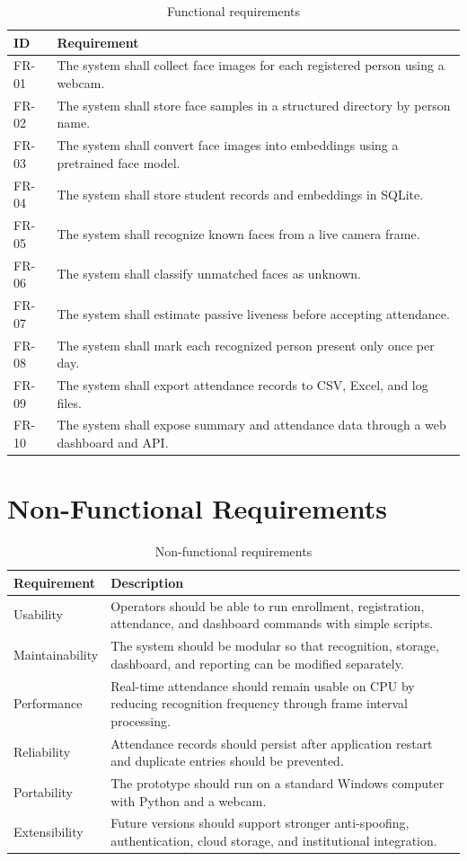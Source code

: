 \documentclass[12pt,a4paper]{report}
\newcommand{\JustifiedNormal}{\fontsize{12}{14}\selectfont\justifying\setlength{\parindent}{0pt}}
\begin{document}
\begin{longtable}{|p{}|p{}|}
\caption{Functional requirements}\\
\hline
\textbf{ID} & \textbf{Requirement}\\
\hline
FR-01 & The system shall collect face images for each registered person using a webcam.\\
\hline
FR-02 & The system shall store face samples in a structured directory by person name.\\
\hline
FR-03 & The system shall convert face images into embeddings using a pretrained face model.\\
\hline
FR-04 & The system shall store student records and embeddings in SQLite.\\
\hline
FR-05 & The system shall recognize known faces from a live camera frame.\\
\hline
FR-06 & The system shall classify unmatched faces as unknown.\\
\hline
FR-07 & The system shall estimate passive liveness before accepting attendance.\\
\hline
FR-08 & The system shall mark each recognized person present only once per day.\\
\hline
FR-09 & The system shall export attendance records to CSV, Excel, and log files.\\
\hline
FR-10 & The system shall expose summary and attendance data through a web dashboard and API.\\
\hline
\end{longtable}

\section{Non-Functional Requirements}
\JustifiedNormal
\begin{longtable}{|p{}|p{}|}
\caption{Non-functional requirements}\\
\hline
\textbf{Requirement} & \textbf{Description}\\
\hline
Usability & Operators should be able to run enrollment, registration, attendance, and dashboard commands with simple scripts.\\
\hline
Maintainability & The system should be modular so that recognition, storage, dashboard, and reporting can be modified separately.\\
\hline
Performance & Real-time attendance should remain usable on CPU by reducing recognition frequency through frame interval processing.\\
\hline
Reliability & Attendance records should persist after application restart and duplicate entries should be prevented.\\
\hline
Portability & The prototype should run on a standard Windows computer with Python and a webcam.\\
\hline
Extensibility & Future versions should support stronger anti-spoofing, authentication, cloud storage, and institutional integration.\\
\hline
\end{longtable}
\end{document}
